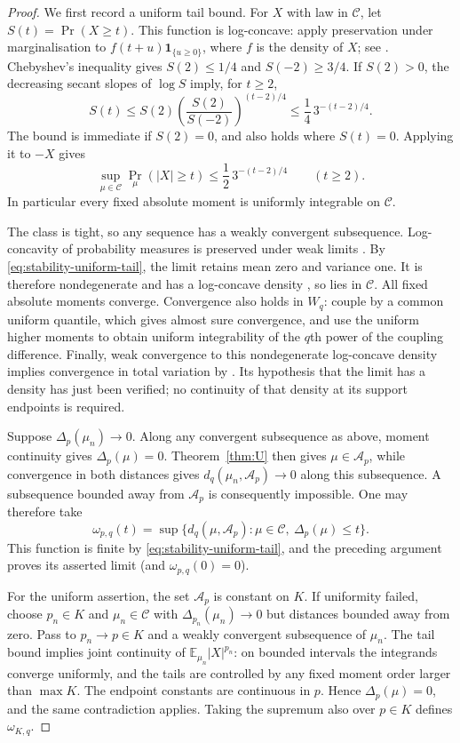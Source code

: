 \documentclass[11pt]{article}
\theoremstyle{remark}
\newcommand{\E}{\mathbb E}
\begin{document}
\begin{proof}
We first record a uniform tail bound. For $X$ with law in $\mathcal C$,
let $S(t)=\Pr(X\ge t)$. This function is log-concave: apply preservation
under marginalisation to $f(t+u)\mathbf1_{\{u\ge0\}}$, where $f$ is
the density of $X$; see \cite[Theorem~3.3]{SW}.
Chebyshev's inequality gives $S(2)\le1/4$ and $S(-2)\ge3/4$.
If $S(2)>0$, the decreasing secant slopes of $\log S$ imply, for $t\ge2$,
\[
 S(t)\le S(2)\left(\frac{S(2)}{S(-2)}\right)^{(t-2)/4}
 \le\frac14\,3^{-(t-2)/4}.
\]
The bound is immediate if $S(2)=0$, and also holds where $S(t)=0$.
Applying it to $-X$ gives
\begin{equation}\label{eq:stability-uniform-tail}
 \sup_{\mu\in\mathcal C}\Pr_\mu(|X|\ge t)
 \le\frac12\,3^{-(t-2)/4}\qquad(t\ge2).
\end{equation}
In particular every fixed absolute moment is uniformly integrable on
$\mathcal C$.

The class is tight, so any sequence has a weakly convergent subsequence.
Log-concavity of probability measures is preserved under weak limits
\cite[Proposition~3.6]{SW}. By \eqref{eq:stability-uniform-tail}, the
limit retains mean zero and variance one. It is therefore nondegenerate
and has a log-concave density \cite[Theorem~2.7]{SW}, so lies in
$\mathcal C$. All fixed absolute moments converge. Convergence also
holds in $W_q$: couple by a common uniform quantile, which gives almost
sure convergence, and use the uniform higher moments to obtain
uniform integrability of the $q$th power of the coupling difference.
Finally, weak convergence to this nondegenerate log-concave density
implies convergence in total variation by
\cite[Proposition~2]{CS}. Its hypothesis that the limit has a density
has just been verified; no continuity of that density at its support
endpoints is required.

Suppose $\Delta_p(\mu_n)\to0$. Along any convergent subsequence as above,
moment continuity gives $\Delta_p(\mu)=0$. Theorem~\ref{thm:U} then
gives $\mu\in\mathcal A_p$, while convergence in both distances gives
$d_q(\mu_n,\mathcal A_p)\to0$ along this subsequence. A subsequence
bounded away from $\mathcal A_p$ is consequently impossible.
One may therefore take
\[
 \omega_{p,q}(t)=\sup\{d_q(\mu,\mathcal A_p):
                 \mu\in\mathcal C,\ \Delta_p(\mu)\le t\}.
\]
This function is finite by \eqref{eq:stability-uniform-tail}, and the
preceding argument proves its asserted limit (and $\omega_{p,q}(0)=0$).

For the uniform assertion, the set $\mathcal A_p$ is constant on $K$.
If uniformity failed, choose $p_n\in K$ and $\mu_n\in\mathcal C$
with $\Delta_{p_n}(\mu_n)\to0$ but distances bounded away from zero.
Pass to $p_n\to p\in K$ and a weakly convergent subsequence of $\mu_n$.
The tail bound implies joint continuity of $\E_{\mu_n}|X|^{p_n}$:
on bounded intervals the integrands converge uniformly, and the tails
are controlled by any fixed moment order larger than $\max K$.
The endpoint constants are continuous in $p$. Hence
$\Delta_p(\mu)=0$, and the same contradiction applies. Taking the
supremum also over $p\in K$ defines $\omega_{K,q}$.
\end{proof}
\end{document}
